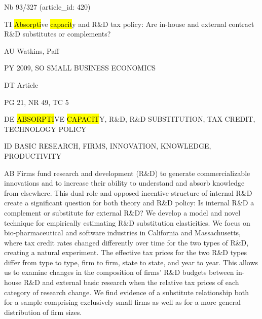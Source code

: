 \documentclass[a4paper]{article}
\begin{document}
\vspace*{-2cm}
Nb \tabto{0cm}93/327 (article\_id: 420)\par
TI \tabto{0cm}\hl{Absorpti}ve \hl{capacit}y and R\&D tax policy: Are in-house and external contract R\&D substitutes or complements?\par
AU \tabto{0cm}Watkins, Paff\par
PY \tabto{0cm}2009, SO SMALL BUSINESS ECONOMICS\par
DT \tabto{0cm}Article\par
PG \tabto{0cm}21, NR 49, TC 5\par
DE \tabto{0cm}\hl{ABSORPTI}VE \hl{CAPACIT}Y, R\&D, R\&D SUBSTITUTION, TAX CREDIT, TECHNOLOGY POLICY\par
ID \tabto{0cm}BASIC RESEARCH, FIRMS, INNOVATION, KNOWLEDGE, PRODUCTIVITY\par
AB \tabto{0cm}Firms fund research and development (R\&D) to generate commercializable innovations and to increase their ability to understand and absorb knowledge from elsewhere. This dual role and opposed incentive structure of internal R\&D create a significant question for both theory and R\&D policy: Is internal R\&D a complement or substitute for external R\&D? We develop a model and novel technique for empirically estimating R\&D substitution elasticities. We focus on bio-pharmaceutical and software industries in California and Massachusetts, where tax credit rates changed differently over time for the two types of R\&D, creating a natural experiment. The effective tax prices for the two R\&D types differ from type to type, firm to firm, state to state, and year to year. This allows us to examine changes in the composition of firms' R\&D budgets between in-house R\&D and external basic research when the relative tax prices of each category of research change. We find evidence of a substitute relationship both for a sample comprising exclusively small firms as well as for a more general distribution of firm sizes.\par
\clearpage
\end{document}
